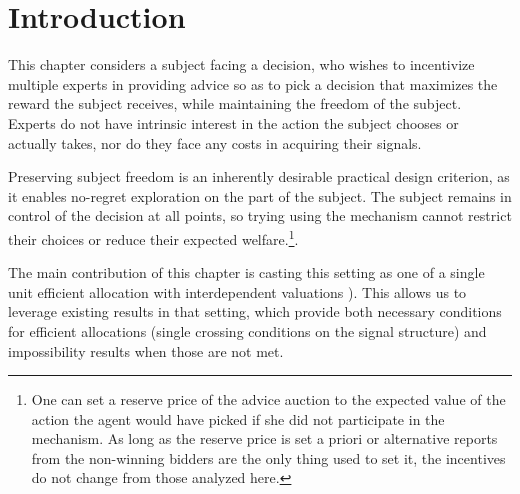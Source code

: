 
\section{Introduction}



This chapter considers a subject facing a decision, who wishes to incentivize multiple experts in providing advice so as to pick a decision that maximizes the reward the subject receives, while maintaining the freedom of the subject.
Experts do not have intrinsic interest in the action the subject chooses or actually takes, nor do they face any costs in acquiring their signals.

Preserving subject freedom is an inherently desirable practical design criterion, as it enables no-regret exploration on the part of the subject. The subject remains in control of the decision at all points, so trying using the mechanism cannot restrict their choices or reduce their expected welfare.\footnote{One can set a reserve price of the advice auction to the expected value of the action the agent would have picked if she did not participate in the mechanism. As long as the reserve price is set a priori or alternative reports from the non-winning bidders are the only thing used to set it, the incentives do not change from those analyzed here.}.



The main contribution of this chapter is casting this setting as one of a single unit efficient allocation with interdependent valuations \citep{milgrom1982theory,maskin1992auctions,ausubel1999generalized,mclean2004informational,roughgarden2016optimal,eden2018interdependent}).
This allows us to leverage existing results in that setting, which provide both necessary conditions for efficient allocations (single crossing conditions on the signal structure) and impossibility results when those are not met.

